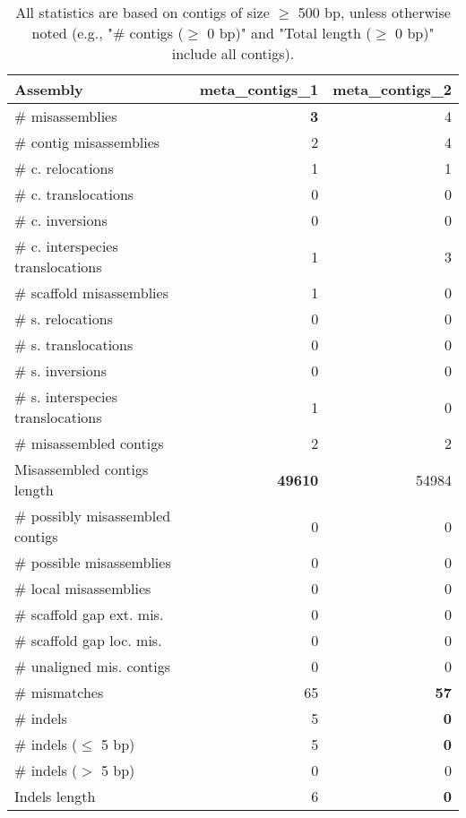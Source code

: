 \documentclass[12pt,a4paper]{article}
\begin{document}
\begin{table}[ht]
\begin{center}
\caption{All statistics are based on contigs of size $\geq$ 500 bp, unless otherwise noted (e.g., "\# contigs ($\geq$ 0 bp)" and "Total length ($\geq$ 0 bp)" include all contigs).}
\begin{tabular}{|l*{2}{|r}|}
\hline
Assembly & meta\_contigs\_1 & meta\_contigs\_2 \\ \hline
\# misassemblies & {\bf 3} & 4 \\ \hline
\hspace{2mm}\# contig misassemblies & 2 & 4 \\ \hline
\hspace{5mm}\# c. relocations & 1 & 1 \\ \hline
\hspace{5mm}\# c. translocations & 0 & 0 \\ \hline
\hspace{5mm}\# c. inversions & 0 & 0 \\ \hline
\hspace{5mm}\# c. interspecies translocations & 1 & 3 \\ \hline
\hspace{2mm}\# scaffold misassemblies & 1 & 0 \\ \hline
\hspace{5mm}\# s. relocations & 0 & 0 \\ \hline
\hspace{5mm}\# s. translocations & 0 & 0 \\ \hline
\hspace{5mm}\# s. inversions & 0 & 0 \\ \hline
\hspace{5mm}\# s. interspecies translocations & 1 & 0 \\ \hline
\# misassembled contigs & 2 & 2 \\ \hline
Misassembled contigs length & {\bf 49610} & 54984 \\ \hline
\# possibly misassembled contigs & 0 & 0 \\ \hline
\hspace{5mm}\# possible misassemblies & 0 & 0 \\ \hline
\# local misassemblies & 0 & 0 \\ \hline
\# scaffold gap ext. mis. & 0 & 0 \\ \hline
\# scaffold gap loc. mis. & 0 & 0 \\ \hline
\# unaligned mis. contigs & 0 & 0 \\ \hline
\# mismatches & 65 & {\bf 57} \\ \hline
\# indels & 5 & {\bf 0} \\ \hline
\hspace{5mm}\# indels ($\leq$ 5 bp) & 5 & {\bf 0} \\ \hline
\hspace{5mm}\# indels ($>$ 5 bp) & 0 & 0 \\ \hline
Indels length & 6 & {\bf 0} \\ \hline
\end{tabular}
\end{center}
\end{table}
\end{document}
